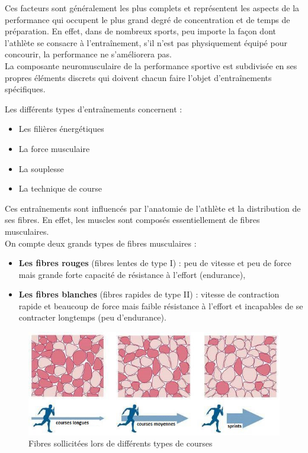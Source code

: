         Ces facteurs sont généralement les plus complets et représentent les aspects de la performance qui occupent le plus grand degré de concentration et de temps de préparation. En effet, dans de nombreux sports, peu importe la façon dont l'athlète se consacre à l'entraînement, s'il n'est pas physiquement équipé pour concourir, la performance ne s'améliorera pas.\\
        
        La composante neuromusculaire de la performance sportive est subdivisée en ses propres éléments discrets qui doivent chacun faire l'objet d'entraînements spécifiques.
        
        Les différents types d'entraînements concernent :
            \begin{itemize}
                \item Les filières énergétiques
                \item La force musculaire
                \item La souplesse
                \item La technique de course\\
            \end{itemize}
        
        Ces entraînements sont influencés par l'anatomie de l'athlète et la distribution de ses fibres. En effet, les muscles sont composés essentiellement de fibres musculaires.\\
      
        On compte deux grands types de fibres musculaires :
        \begin{itemize}
            \item \textbf{Les fibres rouges} (fibres lentes de type I) : peu de vitesse et peu de force mais grande forte capacité de résistance à l’effort (endurance),
            \item \textbf{Les fibres blanches} (fibres rapides de type II) : vitesse de contraction rapide et beaucoup de force mais faible résistance à l’effort et incapables de se contracter longtemps (peu d'endurance).\\
        \end{itemize}
        
        \begin{figure}[H]
            \centering
            \includegraphics[scale=0.7]{images/fibres.jpg}
            \caption{\label{fig:filieres-energetiques}Fibres sollicitées lors de différents types de courses}
        \end{figure}
        
